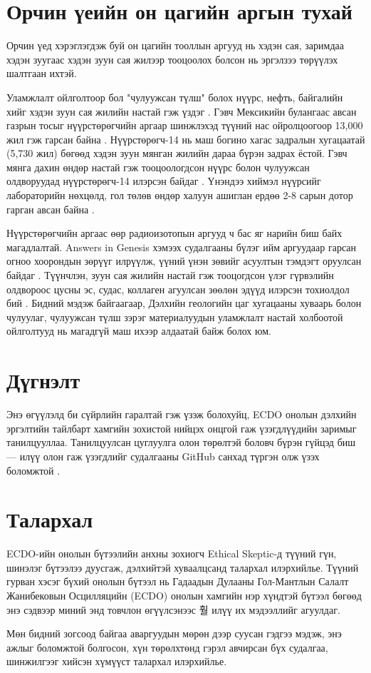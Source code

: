\documentclass[10pt,twocolumn,letterpaper]{article}
\begin{document}
\section{Орчин үеийн он цагийн аргын тухай}

Орчин үед хэрэглэгдэж буй он цагийн тооллын аргууд нь хэдэн сая, заримдаа хэдэн зуугаас хэдэн зуун сая жилээр тооцоолох болсон нь эргэлзээ төрүүлэх шалтгаан ихтэй.

Уламжлалт ойлголтоор бол "чулуужсан түлш" болох нүүрс, нефть, байгалийн хийг хэдэн зуун сая жилийн настай гэж үздэг \cite{104}. Гэвч Мексикийн булангаас авсан газрын тосыг нүүрстөрөгчийн аргаар шинжлэхэд түүний нас ойролцоогоор 13,000 жил гэж гарсан байна \cite{105}. Нүүрстөрөгч-14 нь маш богино хагас задралын хугацаатай (5,730 жил) бөгөөд хэдэн зуун мянган жилийн дараа бүрэн задрах ёстой. Гэвч мянга дахин өндөр настай гэж тооцоологдсон нүүрс болон чулуужсан олдворуудад нүүрстөрөгч-14 илэрсэн байдаг \cite{106}. Үнэндээ хиймэл нүүрсийг лабораторийн нөхцөлд, гол төлөв өндөр халуун ашиглан ердөө 2-8 сарын дотор гарган авсан байна \cite{107}.

Нүүрстөрөгчийн аргаас өөр радиоизотопын аргууд ч бас яг нарийн биш байх магадлалтай. Answers in Genesis хэмээх судалгааны бүлэг ийм аргуудаар гарсан огноо хоорондын зөрүүг илрүүлж, үүний үнэн зөвийг асуултын тэмдэгт оруулсан байдаг \cite{108}. Түүнчлэн, зуун сая жилийн настай гэж тооцогдсон үлэг гүрвэлийн олдвороос цусны эс, судас, коллаген агуулсан зөөлөн эдүүд илэрсэн тохиолдол бий \cite{109,110}. Бидний мэдэж байгаагаар, Дэлхийн геологийн цаг хугацааны хуваарь болон чулуулаг, чулуужсан түлш зэрэг материалуудын уламжлалт настай холбоотой ойлголтууд нь магадгүй маш ихээр алдаатай байж болох юм.

\section{Дүгнэлт}

Энэ өгүүлэлд би сүйрлийн гаралтай гэж үзэж болохуйц, ECDO онолын дэлхийн эргэлтийн тайлбарт хамгийн зохистой нийцэх онцгой гаж үзэгдлүүдийн заримыг танилцууллаа. Танилцуулсан цуглуулга олон төрөлтэй боловч бүрэн гүйцэд биш — илүү олон гаж үзэгдлийг судалгааны GitHub санхад түргэн олж үзэх боломжтой \cite{2}.
\section{Талархал}

ECDO-ийн онолын бүтээлийн анхны зохиогч Ethical Skeptic-д түүний гүн, шинэлэг бүтээлээ дуусгаж, дэлхийтэй хуваалцсанд талархал илэрхийлье. Түүний гурван хэсэг бүхий онолын бүтээл \cite{1} нь Гадаадын Дулааны Гол-Мантлын Салалт Жанибековын Осцилляцийн (ECDO) онолын хамгийн нэр хүндтэй бүтээл бөгөөд энэ сэдвээр миний энд товчлон өгүүлсэнээс 훨 илүү их мэдээллийг агуулдаг.

Мөн бидний зогсоод байгаа аваргуудын мөрөн дээр суусан гэдгээ мэдэж, энэ ажлыг боломжтой болгосон, хүн төрөлхтөнд гэрэл авчирсан бүх судалгаа, шинжилгээг хийсэн хүмүүст талархал илэрхийлье.

\clearpage
\twocolumn

{\small
\renewcommand{\refname}{Эшлэлүүд}


}
\end{document}
